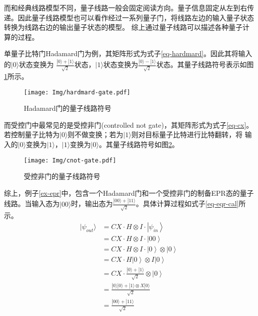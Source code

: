 而和经典线路模型不同，量子线路一般会固定阅读方向。量子信息固定从左到右传递。因此量子线路模型也可以看作经过一系列量子门，将线路左边的输入量子状态转换为线路右边的输出量子状态的模型。
综上通过量子线路可以描述各种量子计算的过程。
\begin{example}
    单量子比特门Hadamard门为例，其矩阵形式为式子\ref{eq-hardmard}。因此其将输入的\(|0\rangle\)状态变换为
\(\frac{|0\rangle+|1\rangle}{\sqrt{2}}\)状态，\(|1\rangle\)状态变换为\(\frac{|0\rangle-|1\rangle}{\sqrt{2}}\)状态。其量子线路符号表示如图\ref{fig-h}所示。
\begin{figure}[htbp]
    \centering
    \texttt{[image: Img/hardmard-gate.pdf]}
    \caption{Hadamard门的量子线路符号}
    \label{fig-h}
\end{figure}

    而受控门中最常见的是受控非门(controlled not gate)，其矩阵形式为式子\ref{eq-cx}。若控制量子比特为\(|0\rangle\)则不做变换；若为\(|1\rangle\)则对目标量子比特进行比特翻转，将
输入的\(|0\rangle\)变换为\(|1\rangle\)，\(|1\rangle\)变换为\(|0\rangle\)。其量子线路符号如图\ref{fig-cx}。
\begin{figure}[htbp]
    \centering
    \texttt{[image: Img/cnot-gate.pdf]}
    \caption{受控非门的量子线路符号}
    \label{fig-cx}
\end{figure}

综上，例子\ref{ex-epr}中，包含一个Hadamard门和一个受控非门的制备EPR态的量子线路。当输入态为\(|00\rangle\)时，输出态为\(\frac{|00\rangle+|11\rangle}{\sqrt{2}}\)。具体计算过程如式子\ref{eq-eqr-cal}所示。
\begin{equation}
    \label{eq-eqr-cal}
    \begin{aligned}
        |\psi_{out}\rangle &=  CX\cdot H\otimes I \cdot \left|\psi_{in}\right\rangle\\
        &= CX\cdot H\otimes I \cdot \left|00\right\rangle\\
        &= CX\cdot H\otimes I \cdot \left|0\right\rangle\otimes \left|0\right\rangle\\
        &= CX\cdot H\left|0\right\rangle\otimes I\left|0\right\rangle\\
        &= CX\cdot \frac{|0\rangle+|1\rangle}{\sqrt{2}} \otimes\left|0\right\rangle\\
        &= \frac{|0\rangle|0\rangle+|1\rangle\otimes X|0\rangle}{\sqrt{2}}\\
        &=\frac{|00\rangle+|11\rangle}{\sqrt{2}}
    \end{aligned}
\end{equation}
\end{example}
